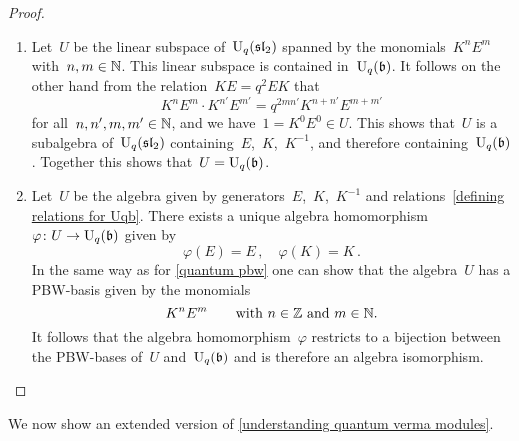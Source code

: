 \documentclass[a4paper, 11pt, oneside]{scrartcl}
\begin{document}
\begin{proof}
  \leavevmode
  \begin{enumerate}
    \item
      Let~$U$ be the linear subspace of~$\operatorname{U}_q(\mathfrak{sl}_2)$ spanned by the monomials~$K^n E^m$ with~$n, m \in \mathbb{N}$.
      This linear subspace is contained in~$\operatorname{U}_q(\mathfrak{b})$.
      It follows on the other hand from the relation~$KE = q^2 EK$ that
      \[
        K^n E^m \cdot K^{n'} E^{m'}
        =
        q^{2 m n'} K^{n + n'} E^{m + m'}
      \]
      for all~$n, n', m, m' \in \mathbb{N}$, and we have~$1 = K^0 E^0 \in U$.
      This shows that~$U$ is a subalgebra of~$\operatorname{U}_q(\mathfrak{sl}_2)$ containing~$E$,~$K$,~$K^{-1}$, and therefore containing~$\operatorname{U}_q(\mathfrak{b})$.
      Together this shows that~$U = \operatorname{U}_q(\mathfrak{b})$.
    \item
      Let~$U$ be the algebra given by generators~$E$,~$K$,~$K^{-1}$ and relations~\eqref{defining relations for Uqb}.
      There exists a unique algebra homomorphism~$\varphi \colon U \to \operatorname{U}_q(\mathfrak{b})$ given by
      \[
        \varphi(E) = E \,,
        \quad
        \varphi(K) = K \,.
      \]
      In the same way as for \cref{quantum pbw} one can show that the algebra~$U$ has a PBW-basis given by the monomials
      \[
        K^n E^m
        \qquad
        \text{with~$n \in \mathbb{Z}$ and~$m \in \mathbb{N}$.}
      \]
      It follows that the algebra homomorphism~$\varphi$ restricts to a bijection between the PBW-bases of~$U$ and~$\operatorname{U}_q(\mathfrak{b})$ and is therefore an algebra isomorphism.
    \qedhere
  \end{enumerate}
\end{proof}

We now show an extended version of \cref{understanding quantum verma modules}.
\end{document}
